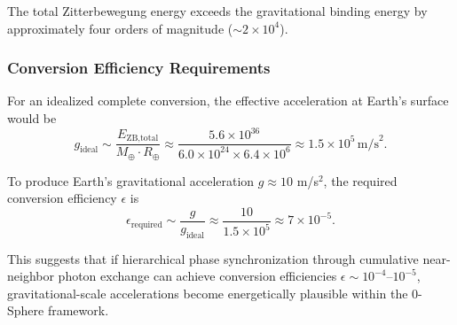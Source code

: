 \documentclass[%
 reprint,
 amsmath,amssymb,
 aps,
 prb,
]{revtex4-2}
\numberwithin{equation}{section}
\begin{document}
The total Zitterbewegung energy exceeds the gravitational binding energy by approximately four orders of magnitude ($\sim 2 \times 10^4$).

\subsubsection{Conversion Efficiency Requirements}

For an idealized complete conversion, the effective acceleration at Earth's surface would be
\begin{equation}
g_{\text{ideal}} \sim \frac{E_{\text{ZB,total}}}{M_{\oplus} \cdot R_{\oplus}} \approx \frac{5.6 \times 10^{36}}{6.0 \times 10^{24} \times 6.4 \times 10^6} \approx 1.5 \times 10^5\,\text{m/s}^2.
\end{equation}

To produce Earth's gravitational acceleration $g \approx 10$ m/s$^2$, the required conversion efficiency $\epsilon$ is
\begin{equation}
\epsilon_{\text{required}} \sim \frac{g}{g_{\text{ideal}}} \approx \frac{10}{1.5 \times 10^5} \approx 7 \times 10^{-5}.
\end{equation}

This suggests that if hierarchical phase synchronization through cumulative near-neighbor photon exchange can achieve conversion efficiencies $\epsilon \sim 10^{-4}$--$10^{-5}$, gravitational-scale accelerations become energetically plausible within the 0-Sphere framework.
\end{document}
